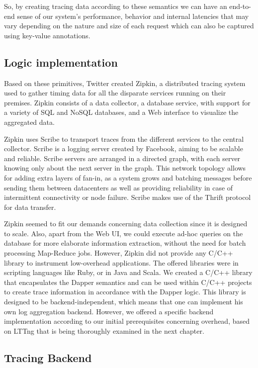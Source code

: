 \documentclass[a4paper,10pt,twocolumn]{article}
\begin{document}
So, by creating tracing data according to these semantics we can have an
end-to-end sense of our system's performance, behavior and internal latencies
that may vary depending on the nature and size of each request which can also
be captured using key-value annotations.

\subsection{Logic implementation} Based on these primitives, Twitter created
Zipkin, a distributed tracing system used to gather timing data for all the
disparate services running on their premises. Zipkin consists of a data
collector, a database service, with support for a variety of SQL and NoSQL
databases, and a Web interface to visualize the aggregated data.

Zipkin uses Scribe\cite{scribe} to transport traces from the different services
to the central collector. Scribe is a logging server created by Facebook,
aiming to be scalable and reliable.  Scribe servers are arranged in a directed
graph, with each server knowing only about the next server in the graph. This
network topology allows for adding extra layers of fan-in, as a system grows
and batching messages before sending them between datacenters as well as
providing reliability in case of intermittent connectivity or node failure.
Scribe makes use of the Thrift protocol\cite{thrift} for data transfer.

Zipkin seemed to fit our demands concerning data collection since it is
designed to scale. Also, apart from the Web UI, we could execute ad-hoc queries
on the database for more elaborate information extraction, without the need for
batch processing Map-Reduce jobs. However, Zipkin did not provide any C/C++
library to instrument low-overhead applications. The offered libraries were in
scripting languages like Ruby, or in Java and Scala. We created a C/C++ library
that encapsulates the Dapper semantics and can be used within C/C++ projects to
create trace information in accordance with the Dapper logic.  This library is
designed to be backend-independent, which means that one can implement his own
log aggregation backend.  However, we offered a specific backend implementation
according to our initial prerequisites concerning overhead, based on LTTng that
is being thoroughly examined in the next chapter.

\subsection{Tracing Backend}
\end{document}
